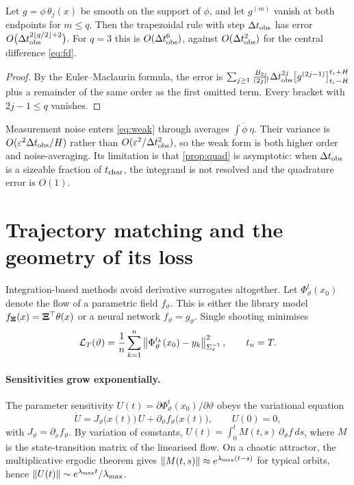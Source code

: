\begin{proposition}\label{prop:quad}
Let $g=\phi\,\theta_j(x)$ be smooth on the support of $\phi$, and let $g^{(m)}$ vanish at both endpoints for $m\le q$. Then the trapezoidal rule with step $\Delta t_{\mathrm{obs}}$ has error $O\big(\Delta t_{\mathrm{obs}}^{2\lfloor q/2\rfloor+2}\big)$. For $q=3$ this is $O(\Delta t_{\mathrm{obs}}^6)$, against $O(\Delta t_{\mathrm{obs}}^2)$ for the central difference \eqref{eq:fd}.
\end{proposition}
\begin{proof}
By the Euler--Maclaurin formula, the error is $\sum_{j\ge1}\frac{B_{2j}}{(2j)!}\Delta t_{\mathrm{obs}}^{2j}\big[g^{(2j-1)}\big]_{t_c-H}^{t_c+H}$ plus a remainder of the same order as the first omitted term. Every bracket with $2j-1\le q$ vanishes.
\end{proof}

Measurement noise enters \eqref{eq:weak} through averages $\int\dot\phi\,\eta$. Their variance is $O(\varepsilon^2\Delta t_{\mathrm{obs}}/H)$ rather than $O(\varepsilon^2/\Delta t_{\mathrm{obs}}^2)$, so the weak form is both higher order and noise-averaging. Its limitation is that \cref{prop:quad} is asymptotic: when $\Delta t_{\mathrm{obs}}$ is a sizeable fraction of $t_{\mathrm{char}}$, the integrand is not resolved and the quadrature error is $O(1)$.

\section{Trajectory matching and the geometry of its loss}\label{sec:tm}

Integration-based methods avoid derivative surrogates altogether. Let $\Phi^t_\vartheta(x_0)$ denote the flow of a parametric field $f_\vartheta$. This is either the library model $f_{\bm{\Xi}}(x)=\bm{\Xi}^\top\theta(x)$ or a neural network $f_\vartheta=g_\vartheta$. Single shooting minimises
\begin{equation}\label{eq:ss}
  \mathcal L_T(\vartheta) = \frac{1}{n}\sum_{k=1}^{n}\left\lVert \Phi^{t_k}_\vartheta(x_0)-y_k\right\rVert^2_{\Sigma_x^{-1}},\qquad t_n=T .
\end{equation}

\paragraph{Sensitivities grow exponentially.} The parameter sensitivity $U(t)=\partial\Phi^t_\vartheta(x_0)/\partial\vartheta$ obeys the variational equation
\begin{equation}\label{eq:sens}
  \dot U = J_\vartheta\big(x(t)\big)\,U + \partial_\vartheta f_\vartheta\big(x(t)\big),\qquad U(0)=0,
\end{equation}
with $J_\vartheta=\partial_x f_\vartheta$. By variation of constants, $U(t)=\int_0^t M(t,s)\,\partial_\vartheta f\,ds$, where $M$ is the state-transition matrix of the linearised flow. On a chaotic attractor, the multiplicative ergodic theorem gives $\left\lVert M(t,s)\right\rVert\approx e^{\lambda_{\max}(t-s)}$ for typical orbits, hence $\left\lVert U(t)\right\rVert\sim e^{\lambda_{\max} t}/\lambda_{\max}$.

